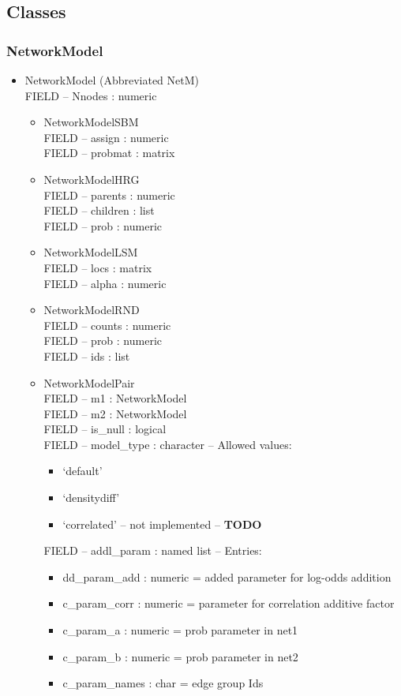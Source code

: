 \documentclass[11pt]{article}
\begin{document}
\subsection{Classes}

\subsubsection{NetworkModel}
\begin{itemize}
\item NetworkModel (Abbreviated NetM)\\
FIELD -- Nnodes : numeric
\begin{itemize}
\item NetworkModelSBM\\
FIELD -- assign : numeric \\
FIELD -- probmat : matrix\\
\item NetworkModelHRG\\
FIELD -- parents : numeric\\
FIELD -- children : list\\
FIELD -- prob : numeric\\
\item NetworkModelLSM\\
FIELD -- locs : matrix\\
FIELD -- alpha : numeric\\
\item NetworkModelRND\\
FIELD -- counts : numeric\\
FIELD -- prob : numeric\\
FIELD -- ids : list\\
\item NetworkModelPair\\
FIELD -- m1 : NetworkModel\\
FIELD -- m2 : NetworkModel\\
FIELD -- is\_null : logical\\
FIELD -- model\_type : character -- Allowed values:
\begin{itemize}
\item `default'
\item `densitydiff'
\item `correlated' -- not implemented -- {\bf TODO}
\end{itemize}
FIELD -- addl\_param : named list -- Entries: 
\begin{itemize}
\item dd\_param\_add : numeric = added parameter for log-odds addition
\item c\_param\_corr : numeric = parameter for correlation additive factor
\item c\_param\_a : numeric = prob parameter in net1
\item c\_param\_b : numeric = prob parameter in net2
\item c\_param\_names : char = edge group Ids
\end{itemize}
\end{itemize}
\end{itemize}
\end{document}
